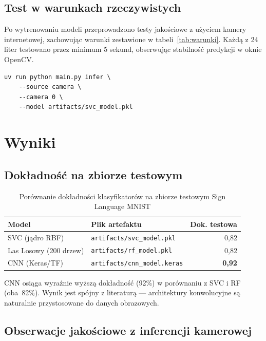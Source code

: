 \subsection{Test w warunkach rzeczywistych}

Po wytrenowaniu modeli przeprowadzono testy jakościowe z użyciem kamery
internetowej, zachowując warunki zestawione w tabeli~\ref{tab:warunki}.
Każdą z 24 liter testowano przez minimum 5 sekund, obserwując stabilność
predykcji w oknie OpenCV.

\begin{lstlisting}[style=styleBash, caption={Uruchomienie inferencji z kamery}, label=lst:infer-cam]
uv run python main.py infer \
    --source camera \
    --camera 0 \
    --model artifacts/svc_model.pkl
\end{lstlisting}

\section{Wyniki}

\subsection{Dokładność na zbiorze testowym}

\begin{table}[H]
    \centering
    \caption{Porównanie dokładności klasyfikatorów na zbiorze testowym Sign Language MNIST}
    \label{tab:wyniki}
    \begin{tabular}{llr}
        \toprule
        \textbf{Model} & \textbf{Plik artefaktu} & \textbf{Dok. testowa} \\
        \midrule
        SVC (jądro RBF)        & \texttt{artifacts/svc\_model.pkl}   & 0{,}82 \\
        Las Losowy (200 drzew) & \texttt{artifacts/rf\_model.pkl}    & 0{,}82 \\
        CNN (Keras/TF)         & \texttt{artifacts/cnn\_model.keras} & \textbf{0{,}92} \\
        \bottomrule
    \end{tabular}
\end{table}

CNN osiąga wyraźnie wyższą dokładność (92\%) w porównaniu z SVC i RF (oba~82\%).
Wynik jest spójny z literaturą --- architektury konwolucyjne są naturalnie
przystosowane do danych obrazowych.

\subsection{Obserwacje jakościowe z inferencji kamerowej}


